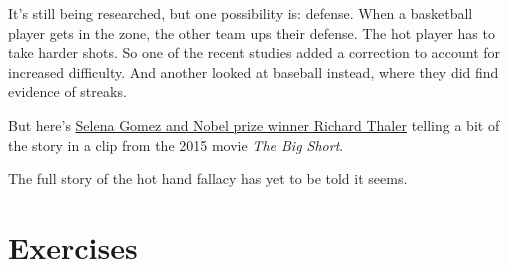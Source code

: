 \documentclass[justified]{tufte-book}
\theoremstyle{definition}
\theoremstyle{definition}
\theoremstyle{definition}
\theoremstyle{remark}
\begin{document}
It's still being researched, but one possibility is: defense. When a basketball player gets in the zone, the other team ups their defense. The hot player has to take harder shots. So one of the recent studies added a correction to account for increased difficulty. And another looked at baseball instead, where they did find evidence of streaks.

\begin{marginfigure}
But here's \href{https://www.youtube.com/watch?v=WStmFKp1x3g}{Selena
Gomez and Nobel prize winner Richard Thaler} telling a bit of the story
in a clip from the 2015 movie \emph{The Big Short}.
\end{marginfigure}

The full story of the hot hand fallacy has yet to be told it seems.

\hypertarget{exercises-3}{%
\section*{Exercises}\label{exercises-3}}
\end{document}
